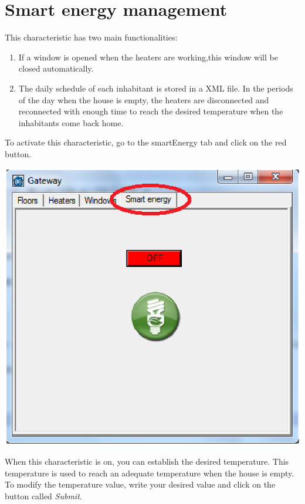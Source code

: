 \section{Smart energy management}
This characteristic has two main functionalities:
\begin{enumerate}
\item If a window is opened when the heaters are working,this window will be closed automatically.
\item The daily schedule of each inhabitant is stored in a XML file. In the periods of the day when the house is empty, the heaters are disconnected and reconnected with enough time to reach the desired temperature when the inhabitants come back home.
\end{enumerate}
To activate this characteristic, go to the smartEnergy tab and click on the red button.
\begin{center}
	\includegraphics[width=.75\linewidth]{images/globalSmartEnergy.eps}
	\\
\vspace{1cm}
\end{center}
When this characteristic is on, you can establish the desired temperature. This temperature is used to reach an adequate temperature when the house is empty. To modify the temperature value, write your desired value and click on the button called \emph{Submit}.
